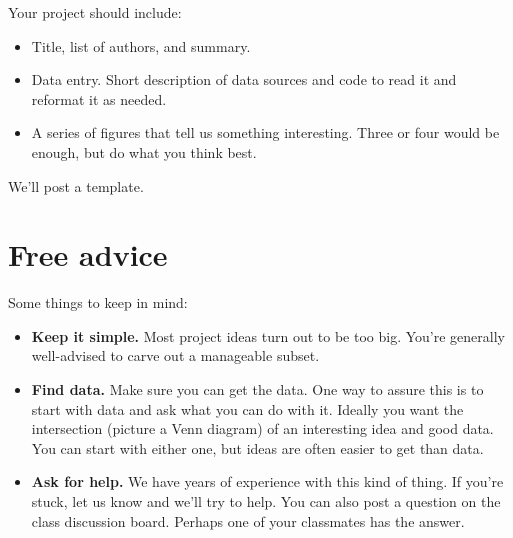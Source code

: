\documentclass[11pt]{article}
\begin{document}
\begin{itemize}
Your project should include:
\begin{itemize}
\item Title, list of authors, and summary.
\item Data entry.  Short description of data sources and code to read it
and reformat it as needed.
\item A series of figures that tell us something interesting.
Three or four would be enough, but do what you think best.
\end{itemize}
We'll post a template.
\end{itemize}


\section*{Free advice}

Some things to keep in mind:
%
\begin{itemize}
\item {\bf Keep it simple.}
Most project ideas turn out to be too big.  You're generally well-advised
to carve out a manageable subset.

\item {\bf Find data.}  Make sure you can get the data.
One way to assure this is to start with data and ask what you can do with it.
Ideally you want the intersection (picture a Venn diagram) of an interesting
idea and good data.  You can start with either one, but ideas are often easier to
get than data.

\item {\bf Ask for help.}
We have years of experience with this kind of thing.
If you're stuck, let us know and we'll try to help.
You can also post a question on the class discussion board.
Perhaps one of your classmates has the answer.

\end{itemize}





\end{document}
